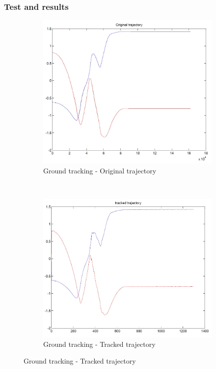 \subsubsection{Test and results}


\begin{figure}[h]
	\centering
	\begin{subfigure}[b]{0.4\linewidth}
		\centering
		\includegraphics[width=\linewidth]{../Images/c3/sim3_traj_ori}
		\caption{Ground tracking - Original trajectory}
		\label{fig:sim3_traj_ori}
	\end{subfigure}
	~
	\begin{subfigure}[b]{0.4\linewidth}
		\centering
		\includegraphics[width=\linewidth]{../Images/c3/sim3_traj_track}
		\caption{Ground tracking - Tracked trajectory}
		\label{fig:sim3_traj_track}
	\end{subfigure}

\end{figure}


